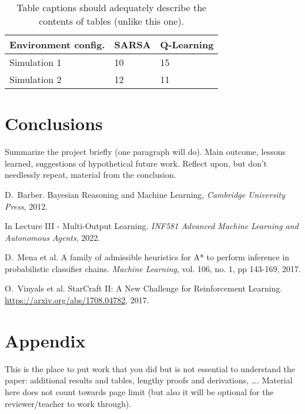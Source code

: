 \documentclass[journal, a4paper]{IEEEtran}
\begin{document}
\begin{table}[h!]
	\caption{\label{results_table}Table captions should adequately describe the contents of tables (unlike this one).}
	\centering
	\begin{tabular}{lll}
		\hline
		\textbf{Environment config.} & \textbf{SARSA} & \textbf{Q-Learning}  \\
		\hline
		Simulation 1        & 10             & 15 \\
		Simulation 2        & 12             & 11 \\
		\hline
	\end{tabular}
\end{table}

\section{Conclusions}
	Summarize the project briefly (one paragraph will do). Main outcome, lessons learned, suggestions of hypothetical future work. 
	Reflect upon, but don't needlessly repeat, material from the conclusion. 

\begin{thebibliography}{4}

	D.~Barber. Bayesian Reasoning and Machine Learning,
	{\em Cambridge University Press}, 2012.

		In Lecture III - Multi-Output Learning. \textit{INF581 Advanced Machine Learning and Autonomous Agents}, 2022.

	D.~Mena et al. A family of admissible heuristics for A* to perform inference in probabilistic classifier chains.
	{\em Machine Learning}, vol. 106, no. 1, pp 143-169, 2017.

	O.~Vinyals et al. StarCraft {II:} {A} New Challenge for Reinforcement Learning.
	\url{https://arxiv.org/abs/1708.04782}, 2017. 

\end{thebibliography}

\newpage
\section*{Appendix}
This is the place to put work that you did but is not essential to understand the paper: additional results and tables, lengthy proofs and derivations, \ldots. Material here does not count towards page limit (but also it will be optional for the reviewer/teacher to work through). 
\end{document}
